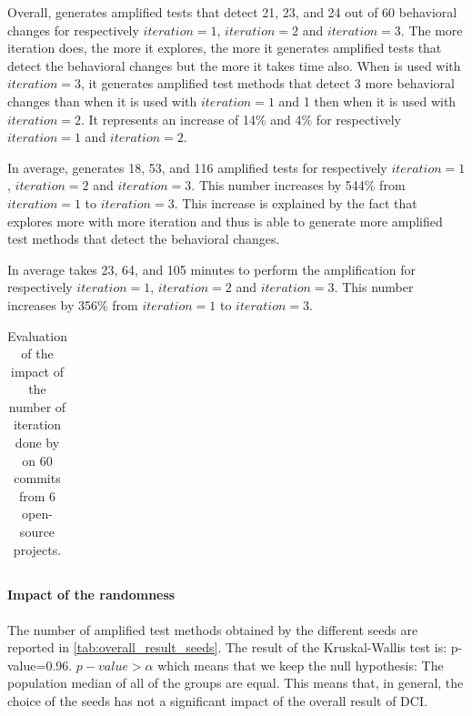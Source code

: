 Overall, \DCII generates amplified tests that detect 21, 23, and 24 out of 60 behavioral changes for respectively $iteration=1$, $iteration=2$ and $iteration=3$.
The more iteration \DCII does, the more it explores, the more it generates amplified tests that detect the behavioral changes but the more it takes time also.
When \DCII is used with $iteration=3$, it generates amplified test methods that detect 3 more behavioral changes than when it is used with $iteration=1$ and 1 then when it is used with $iteration=2$. It represents an increase of 14\% and 4\% for respectively $iteration=1$ and $iteration=2$.

In average, \DCII generates 18, 53, and 116 amplified tests for respectively $iteration=1$, $iteration=2$ and $iteration=3$. 
This number increases by 544\% from $iteration=1$ to $iteration=3$.
This increase is explained by the fact that \DCII explores more with more iteration and thus is able to generate more amplified test methods that detect the behavioral changes.

In average \DCII takes 23, 64, and 105 minutes to perform the amplification for respectively $iteration=1$, $iteration=2$ and $iteration=3$.
This number increases by 356\% from $iteration=1$ to $iteration=3$.

\begin{table}
\small
\def\arraystretch{1}%
\setlength\tabcolsep{6pt} %
\caption{Evaluation of the impact of the number of iteration done by \DCII on 60 commits from 6 open-source projects.}
\label{tab:overall_result_iteration}
\begin{tabular}{l|c|cc|cc|cc}

\end{tabular}
\end{table}

\paragraph{Impact of the randomness}

The number of amplified test methods obtained by the different seeds are reported in \autoref{tab:overall_result_seeds}.
The result of the Kruskal-Wallis test is:  p-value=0.96.
$p-value>\alpha$ which means that we keep the null hypothesis: 
The population median of all of the groups are equal.
This means that, in general, the choice of the seeds has not a significant impact of the overall result of DCI.

